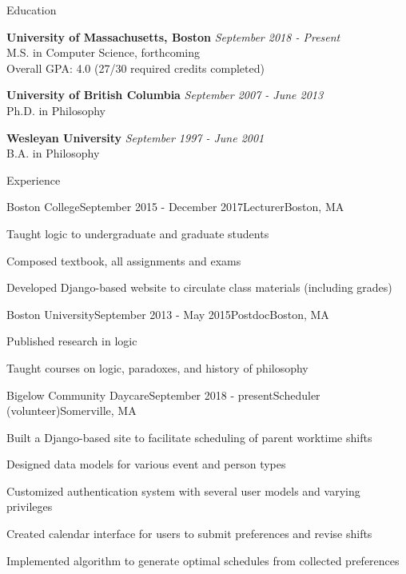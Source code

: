 \documentclass{resume} %
\begin{document}

\begin{rSection}{Education}

{\bf University of Massachusetts, Boston} \hfill {\em September 2018 - Present} \\ 
M.S. in Computer Science, forthcoming\\
Overall GPA: 4.0  (27/30 required credits completed)

{\bf University of British Columbia} \hfill {\em September 2007 - June 2013} \\ 
Ph.D. in Philosophy

{\bf Wesleyan University} \hfill {\em September 1997 - June 2001} \\ 
B.A. in Philosophy


\end{rSection}


\begin{rSection}{Experience}

\begin{rSubsection}{Boston College}{September 2015 - December 2017}{Lecturer}{Boston, MA}
\item Taught logic to undergraduate and graduate students
\item Composed textbook, all assignments and exams
\item Developed Django-based website to circulate class materials (including grades)
\end{rSubsection}

\begin{rSubsection}{Boston University}{September 2013 - May 2015}{Postdoc}{Boston, MA}
\item Published research in logic
\item Taught courses on logic, paradoxes, and history of philosophy
\end{rSubsection}

\begin{rSubsection}{Bigelow Community Daycare}{September 2018 - present}{Scheduler (volunteer)}{Somerville, MA}
\item Built a Django-based site to facilitate scheduling of parent worktime shifts
\item Designed data models for various event and person types
\item Customized authentication system with several user models and varying privileges
\item Created calendar interface for users to submit preferences and revise shifts
\item Implemented algorithm to generate optimal schedules from collected preferences
\end{rSubsection}


\end{rSection}
\end{document}
